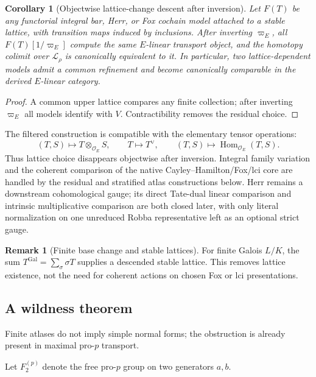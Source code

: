 \documentclass[11pt]{article}
\newtheorem{corollary}[theorem]{Corollary}
\theoremstyle{definition}
\newtheorem{remark}[theorem]{Remark}
\begin{document}
\begin{corollary}[Objectwise lattice-change descent after inversion]\label{cor:lattice-descent}
Let $F(T)$ be any functorial integral bar, Herr, or Fox cochain model attached to a stable lattice, with transition maps induced by inclusions.  After inverting $\varpi_E$, all $F(T)[1/\varpi_E]$ compute the same $E$-linear transport object, and the homotopy colimit over $\mathcal L_\rho$ is canonically equivalent to it.  In particular, two lattice-dependent models admit a common refinement and become canonically comparable in the derived $E$-linear category.
\end{corollary}

\begin{proof}
A common upper lattice compares any finite collection; after inverting $\varpi_E$ all models identify with $V$.  Contractibility removes the residual choice.
\end{proof}

The filtered construction is compatible with the elementary tensor operations:
\[
(T,S)\longmapsto T\otimes_{\mathcal O_E}S,
\qquad
T\longmapsto T^\vee,
\qquad
(T,S)\longmapsto\operatorname{Hom}_{\mathcal O_E}(T,S).
\]
Thus lattice choice disappears objectwise after inversion.  Integral family variation and the coherent comparison of the native Cayley--Hamilton/Fox/lci core are handled by the residual and stratified atlas constructions below.  Herr remains a downstream cohomological gauge; its direct Tate-dual linear comparison and intrinsic multiplicative comparison are both closed later, with only literal normalization on one unreduced Robba representative left as an optional strict gauge.

\begin{remark}[Finite base change and stable lattices]\label{rem:base-change-lattice}
For finite Galois $L/K$, the sum $T^{\mathrm{Gal}}=\sum_{\sigma}\sigma T$ supplies a descended stable lattice.  This removes lattice existence, not the need for coherent actions on chosen Fox or lci presentations.
\end{remark}

\subsection{A wildness theorem}

Finite atlases do not imply simple normal forms; the obstruction is already present in maximal pro-$p$ transport.

Let $F_2^{(p)}$ denote the free pro-$p$ group on two generators $a,b$.
\end{document}
